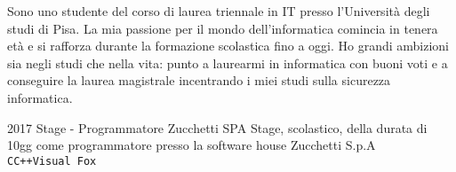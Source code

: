\documentclass[9pt]{developercv} %
\begin{document}
\vspace{0.5cm}



\begin{minipage}[t]{0.4\textwidth} %
	\vspace{-\baselineskip} %

	Sono uno studente del corso di laurea triennale in IT presso l'Università degli studi di Pisa. La mia passione per il mondo dell'informatica
	comincia in tenera età e si rafforza durante la formazione scolastica fino a oggi.	Ho grandi ambizioni sia negli studi che nella vita: punto a laurearmi in informatica con buoni voti e a conseguire la laurea magistrale incentrando i miei studi
	sulla sicurezza informatica.\\
\end{minipage}
\hfill %
\begin{minipage}[t]{0.5\textwidth} %
	\vspace{-\baselineskip} %
\end{minipage}




\begin{entrylist}
	\entry
	{2017}
	{Stage - Programmatore}
	{Zucchetti SPA}
	{Stage, scolastico, della durata di 10gg come programmatore presso la software house Zucchetti S.p.A\\ \texttt{C}\slashsep\texttt{C++}\slashsep\texttt{Visual Fox}}
\end{entrylist}

\end{document}
